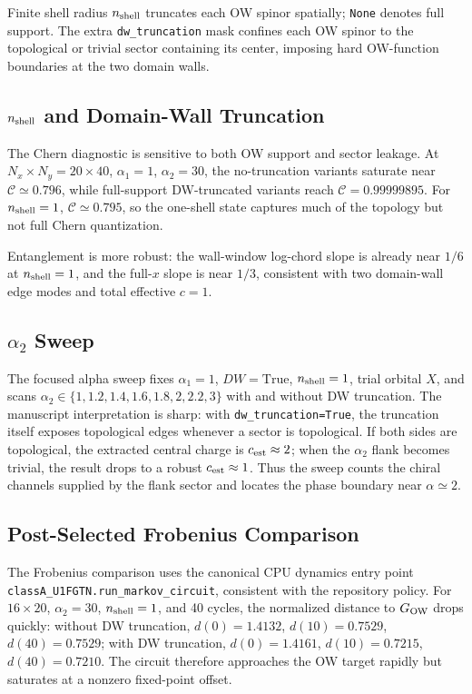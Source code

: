\documentclass[aps,prb,onecolumn,nofootinbib,superscriptaddress]{revtex4-2}
\begin{document}
Finite shell radius $n_{\rm shell}$ truncates each OW spinor spatially; \texttt{None} denotes full support. The extra \texttt{dw\_truncation} mask confines each OW spinor to the topological or trivial sector containing its center, imposing hard OW-function boundaries at the two domain walls.

\subsection{\texorpdfstring{$n_{\rm shell}$}{nshell} and Domain-Wall Truncation}

The Chern diagnostic is sensitive to both OW support and sector leakage. At $N_x\times N_y=20\times40$, $\alpha_1=1$, $\alpha_2=30$, the no-truncation variants saturate near $\mathcal C\simeq0.796$, while full-support DW-truncated variants reach $\mathcal C=0.99999895$. For $n_{\rm shell}=1$, $\mathcal C\simeq0.795$, so the one-shell state captures much of the topology but not full Chern quantization.

Entanglement is more robust: the wall-window log-chord slope is already near $1/6$ at $n_{\rm shell}=1$, and the full-$x$ slope is near $1/3$, consistent with two domain-wall edge modes and total effective $c=1$.

\subsection{\texorpdfstring{$\alpha_2$}{alpha2} Sweep}

The focused alpha sweep fixes $\alpha_1=1$, $DW=\mathrm{True}$, $n_{\rm shell}=1$, trial orbital $X$, and scans $\alpha_2\in\{1,1.2,1.4,1.6,1.8,2,2.2,3\}$ with and without DW truncation. The manuscript interpretation is sharp: with \texttt{dw\_truncation=True}, the truncation itself exposes topological edges whenever a sector is topological. If both sides are topological, the extracted central charge is $c_{\rm est}\approx2$; when the $\alpha_2$ flank becomes trivial, the result drops to a robust $c_{\rm est}\approx1$. Thus the sweep counts the chiral channels supplied by the flank sector and locates the phase boundary near $\alpha\simeq2$.

\subsection{Post-Selected Frobenius Comparison}

The Frobenius comparison uses the canonical CPU dynamics entry point \texttt{classA\_U1FGTN.run\_markov\_circuit}, consistent with the repository policy. For $16\times20$, $\alpha_2=30$, $n_{\rm shell}=1$, and 40 cycles, the normalized distance to $G_{\rm OW}$ drops quickly: without DW truncation, $d(0)=1.4132$, $d(10)=0.7529$, $d(40)=0.7529$; with DW truncation, $d(0)=1.4161$, $d(10)=0.7215$, $d(40)=0.7210$. The circuit therefore approaches the OW target rapidly but saturates at a nonzero fixed-point offset.
\end{document}
